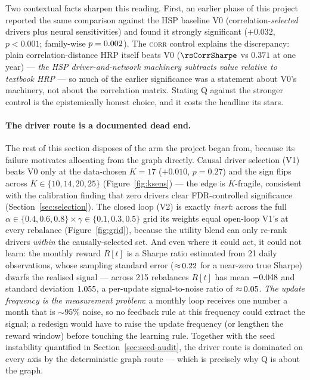 Two contextual facts sharpen this reading. First, an earlier phase of this
project reported the same comparison against the HSP baseline V0
(correlation-\emph{selected} drivers plus neural sensitivities) and found it
strongly significant ($+0.032$, $p<0.001$; family-wise
$p=0.002$). The \textsc{corr} control explains the discrepancy:
plain correlation-distance HRP itself beats V0 ($\rsCorrSharpe$ vs $0.371$ at
one year) --- \emph{the HSP driver-and-network machinery subtracts value
relative to textbook HRP} --- so much of the earlier significance was a
statement about V0's machinery, not about the correlation matrix. Stating Q
against the stronger control is the epistemically honest choice, and it
costs the headline its stars.

\paragraph{The driver route is a documented dead end.} The rest of this
section disposes of the arm the project began from, because its failure
motivates allocating from the graph directly. Causal driver selection (V1)
beats V0 only at the data-chosen $K{=}17$ ($+0.010$, $p=0.27$) and the sign
flips across $K\in\{10,14,20,25\}$ (Figure~\ref{fig:ksens}) --- the edge is
$K$-fragile, consistent with the calibration finding that zero drivers clear
FDR-controlled significance (Section~\ref{sec:selection}). The closed loop
(V2) is exactly \emph{inert}: across the full
$\alpha\in\{0.4,0.6,0.8\}\times\gamma\in\{0.1,0.3,0.5\}$ grid its weights
equal open-loop V1's at every rebalance (Figure~\ref{fig:grid}), because the
utility blend can only re-rank drivers \emph{within} the causally-selected
set. And even where it could act, it could not learn: the monthly reward
$R[t]$ is a Sharpe ratio estimated from 21 daily observations, whose sampling
standard error (${\approx}\,0.22$ for a near-zero true Sharpe) dwarfs
the realised signal --- across 215 rebalances $R[t]$ has mean
$-0.048$ and standard deviation $1.055$, a per-update
signal-to-noise ratio of ${\approx}\,0.05$. \emph{The update
frequency is the measurement problem}: a monthly loop receives one number a
month that is ${\sim}95\%$ noise, so no feedback rule at this frequency
could extract the signal; a redesign would have to raise the update
frequency (or lengthen the reward window) before touching the learning rule.
Together with the seed instability quantified in
Section~\ref{sec:seed-audit}, the driver route is dominated on every axis by
the deterministic graph route --- which is precisely why Q is about the
graph.

